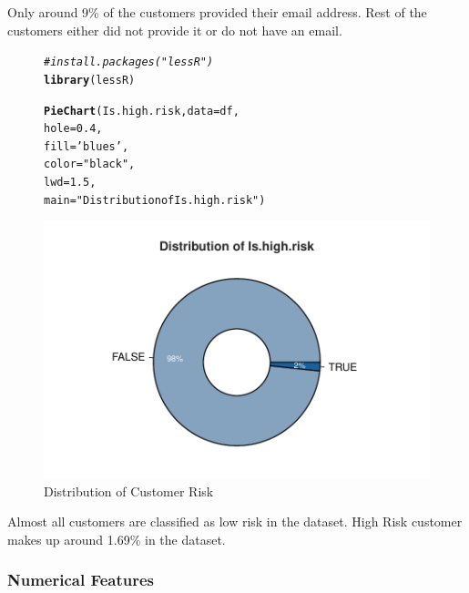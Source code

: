 \documentclass{article}\usepackage[]{graphicx}\usepackage[]{xcolor}
\makeatletter
\def\maxwidth{ %
  \ifdim\Gin@nat@width>\linewidth
    \linewidth
  \else
    \Gin@nat@width
  \fi
}
\newcommand{\hlnum}[1]{\textcolor[rgb]{0.686,0.059,0.569}{#1}}%
\newcommand{\hlsng}[1]{\textcolor[rgb]{0.192,0.494,0.8}{#1}}%
\newcommand{\hlcom}[1]{\textcolor[rgb]{0.678,0.584,0.686}{\textit{#1}}}%
\newcommand{\hldef}[1]{\textcolor[rgb]{0.345,0.345,0.345}{#1}}%
\newcommand{\hlkwc}[1]{\textcolor[rgb]{0.333,0.667,0.333}{#1}}%
\newcommand{\hlkwd}[1]{\textcolor[rgb]{0.737,0.353,0.396}{\textbf{#1}}}%
\newenvironment{kframe}{%
 \def\at@end@of@kframe{}%
 \ifinner\ifhmode%
  \def\at@end@of@kframe{\end{minipage}}%
  \begin{minipage}{\columnwidth}%
 \fi\fi%
 \def\FrameCommand##1{\hskip\@totalleftmargin \hskip-\fboxsep
 \colorbox{shadecolor}{##1}\hskip-\fboxsep
     \hskip-\linewidth \hskip-\@totalleftmargin \hskip\columnwidth}%
 \MakeFramed {\advance\hsize-\width
   \@totalleftmargin\z@ \linewidth\hsize
   \@setminipage}}%
 {\par\unskip\endMakeFramed%
 \at@end@of@kframe}
\newenvironment{knitrout}{}{} %
\makeatother
\begin{document}
Only around 9\% of the customers provided their email address. Rest of the customers either did not provide it or do not have an email.  \\

\begin{figure}[H] %
\centering
\begin{knitrout}
\color{fgcolor}\begin{kframe}
\begin{alltt}
\hlcom{#install.packages("lessR")}
\hlkwd{library}\hldef{(lessR)}

\hlkwd{PieChart}\hldef{(Is.high.risk,} \hlkwc{data} \hldef{= df,}
         \hlkwc{hole} \hldef{=} \hlnum{0.4}\hldef{,}
         \hlkwc{fill} \hldef{=} \hlsng{'blues'}\hldef{,}
         \hlkwc{color} \hldef{=} \hlsng{"black"}\hldef{,}
         \hlkwc{lwd} \hldef{=} \hlnum{1.5}\hldef{,}
         \hlkwc{main} \hldef{=} \hlsng{"Distribution of Is.high.risk"}\hldef{)}
\end{alltt}
\end{kframe}
\includegraphics[width=\maxwidth]{figure/unnamed-chunk-29-1} 
\end{knitrout}
\vspace{-10pt} %
\caption{Distribution of Customer Risk}
\end{figure}

Almost all customers are classified as low risk in the dataset. High Risk customer makes up around 1.69\% in the dataset.  \\

\subsubsection{Numerical Features}
\end{document}
